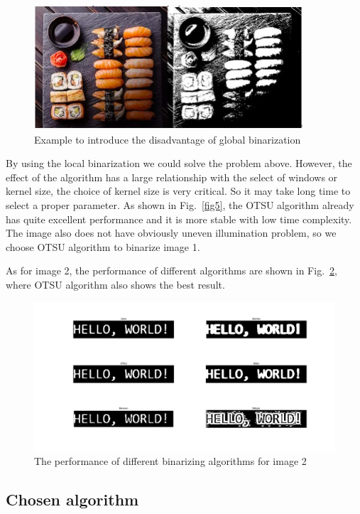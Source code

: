 \documentclass[hyperref]{article}
\theoremstyle{nonumberplain}
\begin{document}
	\begin{figure}[htbp]
		\centering
		\centering
		\includegraphics[width=10cm]{fig6.jpg}
		\caption{Example to introduce the disadvantage of global binarization}
		\label{fig6}
	\end{figure}

	By using the local binarization we could solve the problem above. However, the effect of the algorithm has a large relationship with the select of windows or kernel size, the choice of kernel size is very critical. So it may take long time to select a proper parameter. As shown in Fig.~\ref{fig5}, the OTSU algorithm already has quite excellent performance and it is more stable with low time complexity. The image also does not have obviously uneven illumination problem, so we choose OTSU algorithm to binarize image 1.
	
	As for image 2, the performance of different algorithms are shown in Fig.~\ref{fig7}, where OTSU algorithm also shows the best result.
	
	\begin{figure}[h]
		\centering
		\centering
		\includegraphics[width=12cm]{fig7.jpg}
		\caption{The performance of different binarizing algorithms for image 2}
		\label{fig7}
	\end{figure}
	
	
	
	\subsection{Chosen algorithm}
	
\end{document}
